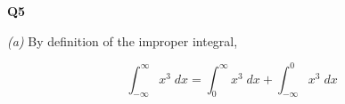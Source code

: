 \documentclass[12pt, a4paper]{article}
\begin{document}
\textbf{Q5}

\textit{(a)}
By definition of the improper integral,

\[
    \int_{-\infty}^{\infty}x^3\;dx
    = \int_0^\infty x^3\;dx
    + \int_{-\infty}^0 x^3\;dx
\]
\end{document}
